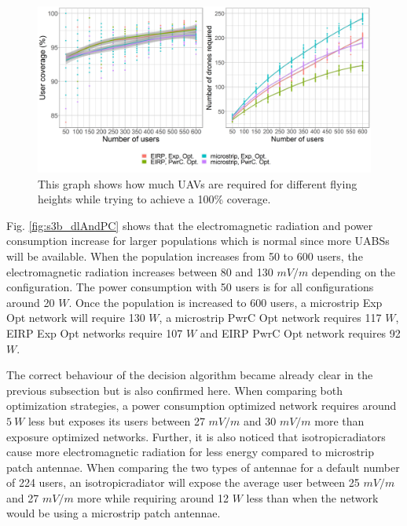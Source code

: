 \documentclass[twocolumn]{phdsymp} %
\begin{document}
\begin{figure}[h]
  \includegraphics[width=\linewidth]{../results/s3/uvsnumdronesAndCov.png}
  \caption{This graph shows how much \acs{UAV}s are required for different flying heights while trying to achieve a 100\% coverage.}
  \label{fig:s3b_numdronesAndCov}
\end{figure}


Fig. \ref{fig:s3b_dlAndPC} shows that the electromagnetic radiation and power consumption increase for larger 
populations which is normal since more \gls{UABS}s will be available.
When the population increases from 50 to 600 users, the electromagnetic radiation increases 
between 80 and 130 $mV/m$ depending on the configuration. The power consumption with 50 users is for all configurations around 
20 $W$. Once the population is increased to 600 users, a microstrip \gls{Exp Opt} network will require 130 $W$, 
 a microstrip \gls{PwrC Opt} network requires 117 $W$,
\gls{EIRP} \gls{Exp Opt} networks require 107 $W$ and \gls{EIRP} \gls{PwrC Opt} network requires 92 $W$.

The correct behaviour of the decision algorithm became already clear in the previous subsection but is also
confirmed here. 
When comparing both optimization strategies, a power consumption optimized network requires around $5\ W$ less but exposes its users between 27 $mV/m$ and 30 $mV/m$ more than
exposure optimized networks. 
Further, it is also noticed that \gls{isotropicradiator}s cause more electromagnetic radiation for less energy
compared to microstrip patch antennae. 
When comparing the two types of antennae for a default number of 224 users, 
an \gls{isotropicradiator} will expose the average user 
between 25 $mV/m$ and 27 $mV/m$ more while requiring around 12 $W$ less than when the network would be using a microstrip patch antennae.
\end{document}

